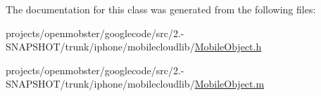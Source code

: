 \-The documentation for this class was generated from the following files\-:\begin{DoxyCompactItemize}
\item 
projects/openmobster/googlecode/src/2.-\/\-S\-N\-A\-P\-S\-H\-O\-T/trunk/iphone/mobilecloudlib/\hyperlink{_mobile_object_8h}{\-Mobile\-Object.\-h}\item 
projects/openmobster/googlecode/src/2.-\/\-S\-N\-A\-P\-S\-H\-O\-T/trunk/iphone/mobilecloudlib/\hyperlink{_mobile_object_8m}{\-Mobile\-Object.\-m}\end{DoxyCompactItemize}
